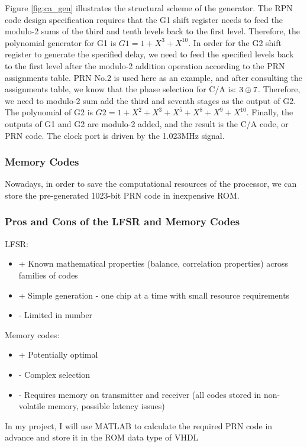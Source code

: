 Figure \ref{fig:ca_gen} illustrates the structural scheme of the generator. The RPN code design specification requires that the G1 shift register needs to feed the modulo-2 sums of the third and tenth levels back to the first level. Therefore, the polynomial generator for G1 is $G1=1+X^3+X^{10}$. In order for the G2 shift register to generate the specified delay, we need to feed the specified levels back to the first level after the modulo-2 addition operation according to the PRN assignments table. PRN No.2 is used here as an example, and after consulting the assignments table\cite{RN170}, we know that the phase selection for C/A is: $3\oplus 7$. Therefore, we need to modulo-2 sum add the third and seventh stages as the output of G2. The polynomial of G2 is $G2=1+X^2+X^3+X^5+X^8+X^9+X^{10}$. Finally, the outputs of G1 and G2 are modulo-2 added, and the result is the C/A code, or PRN  code. The clock port is driven by the 1.023MHz signal.

\subsubsection{Memory Codes}
Nowadays, in order to save the computational resources of the processor, we can store the pre-generated 1023-bit PRN code in inexpensive ROM.

\subsubsection{Pros and Cons of the LFSR and Memory Codes}
LFSR:
\begin{itemize}
    \item + Known mathematical properties (balance, correlation properties) across families of codes
    \item + Simple generation - one chip at a time with small resource requirements
    \item - Limited in number
\end{itemize}
Memory codes:
\begin{itemize}
    \item + Potentially optimal
    \item - Complex selection
    \item - Requires memory on transmitter and receiver (all codes stored in non-volatile memory, possible latency issues)
\end{itemize}
In my project, I will use MATLAB to calculate the required PRN code in advance and store it in the ROM data type of VHDL

